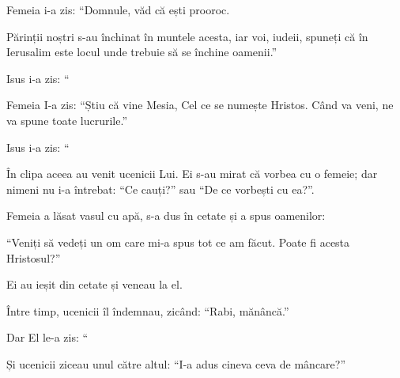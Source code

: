 {\par }{\PP {}Femeia i-a zis: “Domnule, văd că ești prooroc.

Părinții noștri s-au închinat în muntele acesta, iar voi, iudeii, spuneți că în Ierusalim este locul unde trebuie să se închine oamenii.”


\par }{\PP {}Isus i-a zis: “{}





\par }{\PP {}Femeia I-a zis: “Știu că vine Mesia, Cel ce se numește Hristos. Când va veni, ne va spune toate lucrurile.”


\par }{\PP {}Isus i-a zis: “{}


\par }{\PP {}În clipa aceea au venit ucenicii Lui. Ei s-au mirat că vorbea cu o femeie; dar nimeni nu i-a întrebat: “Ce cauți?” sau “De ce vorbești cu ea?”.

Femeia a lăsat vasul cu apă, s-a dus în cetate și a spus oamenilor:

“Veniți să vedeți un om care mi-a spus tot ce am făcut. Poate fi acesta Hristosul?”

Ei au ieșit din cetate și veneau la el.


\par }{\PP {}Între timp, ucenicii îl îndemnau, zicând: “Rabi, mănâncă.”


\par }{\PP {}Dar El le-a zis: “{}


\par }{\PP {}Și ucenicii ziceau unul către altul: “I-a adus cineva ceva de mâncare?”


}
